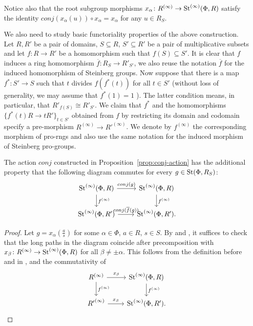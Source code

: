 \documentclass[oneside, 11pt]{amsart} \pdfoutput=1
\begin{document}
\begin{rem} \label{rem:conj-root-action}
 Notice also that the root subgroup morphisms $x_\alpha \colon R^{(\infty)} \to \mathop{\mathrm{St}}\nolimits^{(\infty)}(\Phi, R)$ satisfy the identity $conj(x_\alpha(u)) \circ x_\alpha = x_\alpha$ for any $u \in R_S$.
\end{rem}

We also need to study basic functoriality properties of the above construction.
Let $R, R'$ be a pair of domains, $S \subseteq R$, $S' \subseteq R'$ be a pair of multiplicative subsets and let $f \colon R \to R'$ be a homomorphism such that $f(S)\subseteq S'$.
It is clear that $f$ induces a ring homomorphism $\overline{f}\colon R_S \to R'_{S'}$, we also reuse the notation $\overline{f}$ for the induced homomorphism of Steinberg groups.
Now suppose that there is a map $f^* \colon S' \to S$ such that $t$ divides $f(f^*(t))$ for all $t \in S'$ (without loss of generality, we may assume that $f^*(1)=1$ ). The latter condition means, in particular, that $R'_{f(S)} \cong R'_{S'}$. We claim that $f^*$ and the homomorphisms $\{f^*(t)R \to tR'\}_{t\in S'}$ obtained from $f$ by restricting its domain and codomain specify a pre-morphism $R^{(\infty)} \to R'^{(\infty)}$. We denote by $f^{(\infty)}$ the corresponding morphism of pro-rngs and also use the same notation for the induced morphism of Steinberg pro-groups.

\begin{prop} \label{prop:functoriality}
 The action $conj$ constructed in Proposition~\ref{prop:conj-action} has the additional property that the following diagram commutes for every $g \in \mathop{\mathrm{St}}\nolimits(\Phi, R_S)$:
 \begin{equation} \label{eq:conj-finfty} \begin{tikzcd} \St^{(\infty)}(\Phi, R) \ar{r}{conj(g)} \ar{d}{f^{(\infty)}} & \St^{(\infty)}(\Phi, R) \ar{d}{f^{(\infty)}} \\ \St^{(\infty)}(\Phi, R') \ar{r}{conj(\overline{f}(g))} & \St^{(\infty)}(\Phi, R'). \end{tikzcd} \end{equation}
\end{prop}
\begin{proof}
Let \(g = x_\alpha(\frac a s)\) for some \(\alpha \in \Phi\), \(a \in R\), \(s \in S\). By \cite[Lemma~3.2]{LSV20} and \cite[Lemma~11]{V20}, it suffices to check that the long paths in the diagram coincide after precomposition with \(x_\beta \colon R^{(\infty)} \to \mathop{\mathrm{St}}\nolimits^{(\infty)}(\Phi, R)\) for all \(\beta \neq \pm \alpha\). This follows from the definition before~\cite[Proposition~4.2]{LSV20} and in \cite[\S 10]{V20}, and the commutativity of
\[\begin{tikzcd}
R^{(\infty)} \ar{r}{x_\beta} \ar{d}{f^{(\infty)}} &
\St^{(\infty)}(\Phi, R) \ar{d}{f^{(\infty)}} \\
{R'}^{(\infty)} \ar{r}{x_\beta} & \St^{(\infty)}(\Phi, R'). \end{tikzcd}\]

\end{proof}
\end{document}
